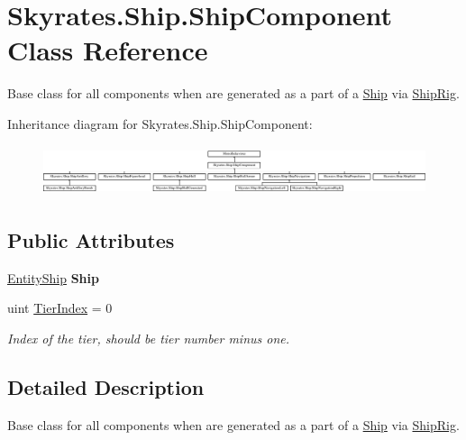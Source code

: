 \hypertarget{class_skyrates_1_1_ship_1_1_ship_component}{\section{Skyrates.\-Ship.\-Ship\-Component Class Reference}
\label{class_skyrates_1_1_ship_1_1_ship_component}
}


Base class for all components when are generated as a part of a \hyperlink{namespace_skyrates_1_1_ship}{Ship} via \hyperlink{class_skyrates_1_1_ship_1_1_ship_rig}{Ship\-Rig}.  


Inheritance diagram for Skyrates.\-Ship.\-Ship\-Component\-:\begin{figure}[H]
\begin{center}
\leavevmode
\includegraphics[height=1.488372cm]{class_skyrates_1_1_ship_1_1_ship_component}
\end{center}
\end{figure}
\subsection*{Public Attributes}
\begin{DoxyCompactItemize}
\item 
\hypertarget{class_skyrates_1_1_ship_1_1_ship_component_a168ce6990e54d3b382ab325b3070e020}{\hyperlink{class_skyrates_1_1_entity_1_1_entity_ship}{Entity\-Ship} {\bfseries Ship}}\label{class_skyrates_1_1_ship_1_1_ship_component_a168ce6990e54d3b382ab325b3070e020}

\item 
uint \hyperlink{class_skyrates_1_1_ship_1_1_ship_component_acb8438da55bb68dfc713c4f340627097}{Tier\-Index} = 0
\begin{DoxyCompactList}\small\item\em Index of the tier, should be tier number minus one. \end{DoxyCompactList}\end{DoxyCompactItemize}


\subsection{Detailed Description}
Base class for all components when are generated as a part of a \hyperlink{namespace_skyrates_1_1_ship}{Ship} via \hyperlink{class_skyrates_1_1_ship_1_1_ship_rig}{Ship\-Rig}. 



